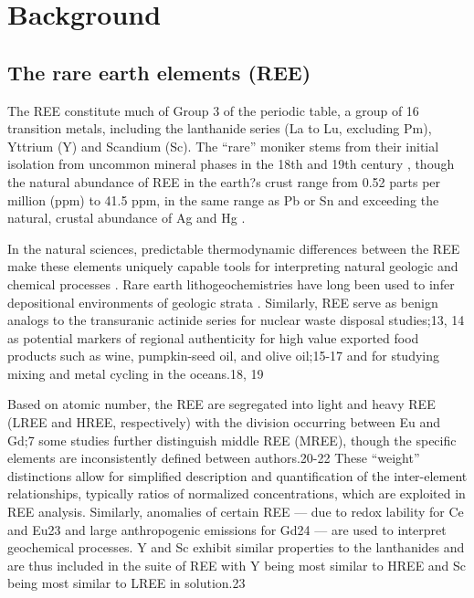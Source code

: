 \chapter{Background}

\section{The rare earth elements (REE)}

The REE constitute much of Group 3 of the periodic table, a group of 16 transition metals, including the lanthanide series (La to Lu, excluding Pm), Yttrium (Y) and Scandium (Sc).
The ``rare'' moniker stems from their initial isolation from uncommon mineral phases in the 18th and 19th century \citep{CastorHedrick}, though the natural abundance of REE in the earth?s crust range from 0.52 parts per million (ppm) to 41.5 ppm, in the same range as Pb or Sn and exceeding the natural, crustal abundance of Ag and Hg \citep{CRC}.

In the natural sciences, predictable thermodynamic differences between the REE make these elements uniquely capable tools for interpreting natural geologic and chemical processes \citep{Murray_Geol_1990, Laveuf_Geoderma_2009}.
Rare earth lithogeochemistries have long been used to infer depositional environments of geologic strata \citep{Murray_Geol_1990, PAAS, Hanson_AREPS_1980}.
Similarly, REE serve as benign analogs to the transuranic actinide series for nuclear waste disposal studies;13, 14
as potential markers of regional authenticity for high value exported food products such as wine, pumpkin-seed oil, and olive oil;15-17
and for studying mixing and metal cycling in the oceans.18, 19

Based on atomic number, the REE are segregated into light and heavy REE (LREE and HREE, respectively) with the division occurring between Eu and Gd;7
some studies further distinguish middle REE (MREE), though the specific elements are inconsistently defined between authors.20-22
These ``weight'' distinctions allow for simplified description and quantification of the inter-element relationships, typically ratios of normalized concentrations, which are exploited in REE analysis.
Similarly, anomalies of certain REE --- due to redox lability for Ce and Eu23 and large anthropogenic emissions for Gd24 --- are used to interpret geochemical processes.
Y and Sc exhibit similar properties to the lanthanides and are thus included in the suite of REE with Y being most similar to HREE and Sc being most similar to LREE in solution.23 

